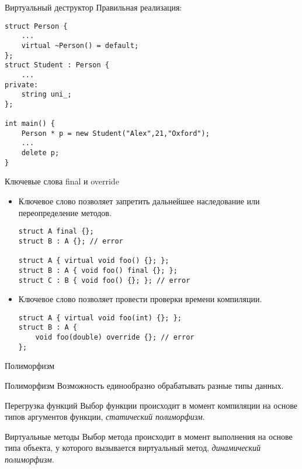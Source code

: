 \documentclass{beamer}
\begin{document}
\begin{frame}[fragile]{Виртуальный деструктор}
Правильная реализация:
    \begin{lstlisting}
struct Person {
    ...
    virtual ~Person() = default;
};
struct Student : Person {
    ...
private:
    string uni_;
};

int main() {
    Person * p = new Student("Alex",21,"Oxford");
    ...
    delete p;
}
    \end{lstlisting}
\end{frame}

\begin{frame}[fragile]{Ключевые слова final и override}
    \begin{itemize}
        \item Ключевое слово  позволяет запретить дальнейшее наследование или переопределение методов.
        \begin{lstlisting}
struct A final {};
struct B : A {}; // error

struct A { virtual void foo() {}; };
struct B : A { void foo() final {}; };
struct C : B { void foo() {}; }; // error
        \end{lstlisting}
        \item Ключевое слово  позволяет провести проверки времени компиляции.
        \begin{lstlisting}
struct A { virtual void foo(int) {}; };
struct B : A {
    void foo(double) override {}; // error
};
                \end{lstlisting}
    \end{itemize}
\end{frame}

\begin{frame}[fragile]{Полиморфизм}
    \begin{block}{Полиморфизм} 
        Возможность единообразно обрабатывать разные типы данных.
    \end{block}

    \begin{block}{Перегрузка функций}
        Выбор функции происходит в момент компиляции на основе типов аргументов
        функции, {\em статический полиморфизм}.
    \end{block}
               
    \begin{block}{Виртуальные методы}
        Выбор метода происходит в момент выполнения на основе типа объекта, у
        которого вызывается виртуальный метод, {\em динамический полиморфизм}. 
    \end{block}
\end{frame}
\end{document}
